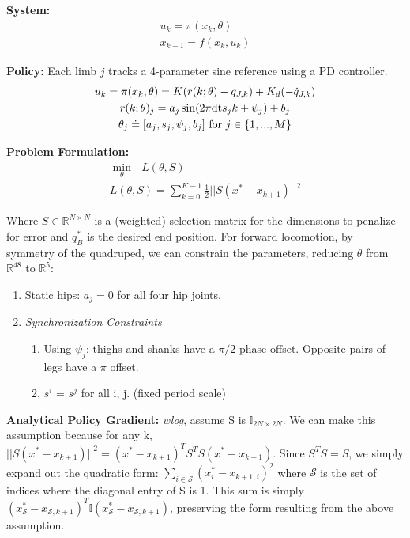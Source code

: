 \documentclass{article}
\newtheorem{claim}{Claim}[section]
\begin{document}
\textbf{System:}
\begin{gather}
    u_k = \pi(x_k, \theta) \\
    x_{k+1} = f(x_{k}, u_{k})
\end{gather}

\textbf{Policy:} Each limb $j$ tracks a 4-parameter sine reference using a PD controller.
\begin{gather}
    u_k = \pi(x_k, \theta) = K(r(k;\theta) - q_{J,k}) + K_d(-\dot{q}_{J,k})\\
    r(k; \theta)_j = a_j \sin(2\pi \mbox{\mbox{dt}} s_j k + \psi_j) + b_j \\
    \theta_j \doteq [a_j, s_j, \psi_j, b_j]
    \mbox{ for } j \in \{1, ..., M\}
\end{gather}

\textbf{Problem Formulation: }
\begin{gather}
    \underset{\theta}{\min} \mbox{ } L(\theta, S) \\
    L(\theta, S) = \sum_{k=0}^{K-1} \frac{1}{2} || S(x^* - x_{k+1}) ||^2
\end{gather}

Where $S \in \mathbb{R}^{N\times N}$ is a (weighted) selection matrix for the dimensions to penalize for error and $q^*_B$ is the desired end position. For forward locomotion, by symmetry of the quadruped, we can constrain the parameters, reducing $\theta$ from $\mathbb{R}^{48}$ to $\mathbb{R}^5$:
\begin{enumerate}
    \item Static hips: $a_j= 0$ for all four hip joints.
    \item \textit{Synchronization Constraints}
          \begin{enumerate}
              \item Using $\psi_j$: thighs and shanks have a $\pi/2$ phase offset. Opposite pairs of legs have a $\pi$ offset.
              \item $s^i$ = $s^j$ for all i, j. (fixed period scale)
          \end{enumerate}
\end{enumerate}


\textbf{Analytical Policy Gradient: } \textit{wlog}, assume S is $\mathbb{I}_{2N\times 2N}$. We can make this assumption because for any k, $||S(x^* - x_{k+1})||^2 = (x^* - x_{k+1})^T S^T S (x^* - x_{k+1})$. Since $S^T S = S$, we simply expand out the quadratic form: $\sum_{i\in \mathcal{S}} (x^*_i - x_{k+1, i})^2$ where $\mathcal{S}$ is the set of indices where the diagonal entry of S is 1.
This sum is simply $(x_\mathcal{S}^* - x_{\mathcal{S},k+1})^T \mathbb{I}(x_\mathcal{S}^* - x_{\mathcal{S},k+1})$, preserving the form resulting from the above assumption.
\end{document}
